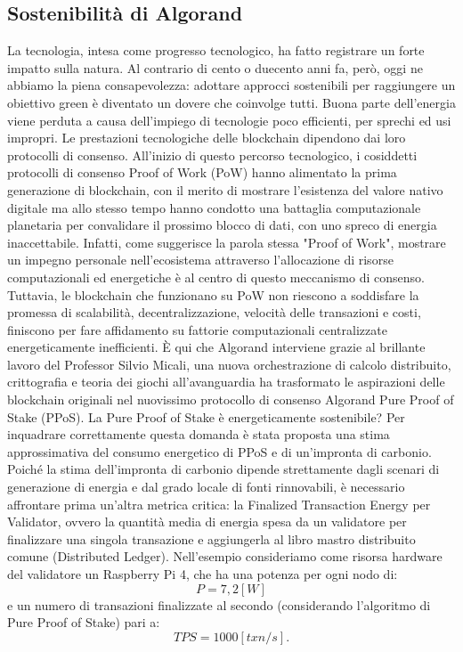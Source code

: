 \subsection{Sostenibilità di Algorand}
La tecnologia, intesa come progresso tecnologico, ha fatto registrare un forte impatto sulla natura. Al contrario di cento o duecento anni fa, però, oggi ne abbiamo la piena consapevolezza: adottare approcci sostenibili per raggiungere un obiettivo green è diventato un dovere che coinvolge tutti. Buona parte dell’energia viene perduta a causa dell’impiego di tecnologie poco efficienti, per sprechi ed usi impropri. Le prestazioni tecnologiche delle blockchain dipendono dai loro protocolli di consenso. All'inizio di questo percorso tecnologico, i cosiddetti protocolli di consenso Proof of Work (PoW) hanno alimentato la prima generazione di blockchain, con il merito di mostrare l'esistenza del valore nativo digitale ma allo stesso tempo hanno condotto una battaglia computazionale planetaria per convalidare il prossimo blocco di dati, con uno spreco di energia inaccettabile. Infatti, come suggerisce la parola stessa "Proof of Work", mostrare un impegno personale nell'ecosistema attraverso l'allocazione di risorse computazionali ed energetiche è al centro di questo meccanismo di consenso. Tuttavia, le blockchain che funzionano su PoW non riescono a soddisfare la promessa di scalabilità, decentralizzazione, velocità delle transazioni e costi, finiscono per fare affidamento su fattorie computazionali centralizzate energeticamente inefficienti. È qui che Algorand interviene grazie al brillante lavoro del Professor Silvio Micali, una nuova orchestrazione di calcolo distribuito, crittografia e teoria dei giochi all'avanguardia ha trasformato le aspirazioni delle blockchain originali nel nuovissimo protocollo di consenso Algorand Pure Proof of Stake (PPoS). La Pure Proof of Stake è energeticamente sostenibile? Per inquadrare correttamente questa domanda è stata proposta una stima approssimativa del consumo energetico di PPoS e di un'impronta di carbonio. Poiché la stima dell'impronta di carbonio dipende strettamente dagli scenari di generazione di energia e dal grado locale di fonti rinnovabili, è necessario affrontare prima un'altra metrica critica: la Finalized Transaction Energy per Validator, ovvero la quantità media di energia spesa da un validatore per finalizzare una singola transazione e aggiungerla al libro mastro distribuito comune (Distributed Ledger). Nell'esempio consideriamo come risorsa hardware del validatore un Raspberry Pi 4, che ha una potenza per ogni nodo di: 
\begin{displaymath}
P = 7,2 [W]
\end{displaymath}
e un numero di transazioni finalizzate al secondo (considerando l'algoritmo di Pure Proof of Stake) pari a:
\begin{displaymath}
TPS = 1000 [txn/s].
\end{displaymath}


